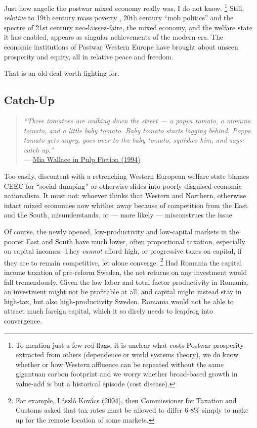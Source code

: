 Just how angelic the postwar mixed economy really was, I do not know.
\footnote{
	To mention just a few red flags, it is unclear what costs Postwar prosperity extracted from others (dependence or world systems theory), we do know whether or how Western affluence can be repeated without the same gigantuan carbon footprint and we worry whether broad-based growth in value-add is but a historical episode (cost disease).
}
Still, \emph{relative} to 19th century mass poverty \citep{MarxEngels-1848-aa}, 20th century ``mob politics'' \citep[158]{Crouch2004} and the spectre of 21st century neo-laissez-faire, the mixed economy, and the welfare state it has enabled, appears as singular achievements of the modern era.
The economic institutions of Postwar Western Europe have brought about unseen prosperity and equity, all in relative peace and freedom.

That is an old deal worth fighting for.

\subsection{Catch-Up}
\begin{quote}
	\emph{``Three tomatoes are walking down the street --- a poppa tomato, a momma tomato, and a little baby tomato.
Baby tomato starts lagging behind.
Poppa tomato gets angry, goes over to the baby tomato, squishes him, and says:
catch up.''} \\
	--- \href{http://www.youtube.com/watch?v=5D-QKY0-Bxk}{Mia Wallace in Pulp Fiction (1994)}
\end{quote}

Too easily, discontent with a retrenching Western European welfare state blames \gls{CEEC} for ``social dumping'' %
or otherwise slides into poorly disguised economic nationalism.
It must not:
whoever thinks that Western and Northern, otherwise intact mixed economies now whither away because of competition from the East and the South, misunderstands, or --- more likely --- misconstrues the issue.

Of course, the newly opened, low-productivity and low-capital markets in the poorer East and South have much lower, often proportional taxation, especially on capital incomes.
They \emph{cannot} afford high, or progressive taxes on capital, if they are to remain competitive, let alone converge.
\footnote{
	For example, L\'{a}szl\'{o} Kov\'{a}cs (2004), then Commissioner for Taxation and Customs asked that tax rates must be allowed to differ 6-8\% simply to make up for the remote location of some markets.
}
Had Romania the capital income taxation of pre-reform Sweden, the net returns on any investment would fall tremendously.
Given the low labor and total factor productivity in Romania, an investment might not be profitable at all, and capital might instead stay in high-tax, but also high-productivity Sweden.
Romania would not be able to attract much foreign capital, which it so direly needs to leapfrog into convergence.


